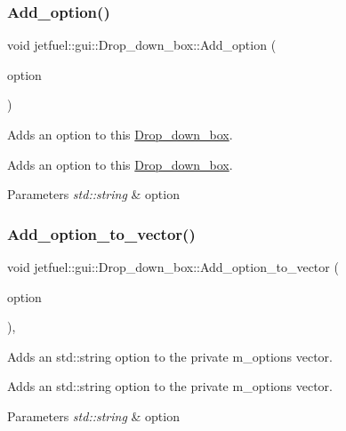 \subsubsection{\texorpdfstring{Add\+\_\+option()}{Add\_option()}}
{\footnotesize\ttfamily void jetfuel\+::gui\+::\+Drop\+\_\+down\+\_\+box\+::\+Add\+\_\+option (\begin{DoxyParamCaption}\item[{const std\+::string}]{option }\end{DoxyParamCaption})}



Adds an option to this \hyperlink{classjetfuel_1_1gui_1_1Drop__down__box}{Drop\+\_\+down\+\_\+box}. 

Adds an option to this \hyperlink{classjetfuel_1_1gui_1_1Drop__down__box}{Drop\+\_\+down\+\_\+box}.


\begin{DoxyParams}{Parameters}
{\em std\+::string} & option \\
\hline
\end{DoxyParams}
\mbox{\label{classjetfuel_1_1gui_1_1Drop__down__box_a5ed3ca41e8d6147e3af3afc94c8b8f1a}} 
\subsubsection{\texorpdfstring{Add\+\_\+option\+\_\+to\+\_\+vector()}{Add\_option\_to\_vector()}}
{\footnotesize\ttfamily void jetfuel\+::gui\+::\+Drop\+\_\+down\+\_\+box\+::\+Add\+\_\+option\+\_\+to\+\_\+vector (\begin{DoxyParamCaption}\item[{const std\+::string}]{option }\end{DoxyParamCaption})\hspace{0.3cm}{\ttfamily [inline]}, {\ttfamily [protected]}}



Adds an std\+::string option to the private m\+\_\+options vector. 

Adds an std\+::string option to the private m\+\_\+options vector.


\begin{DoxyParams}{Parameters}
{\em std\+::string} & option \\
\hline
\end{DoxyParams}
\mbox{\label{classjetfuel_1_1gui_1_1Drop__down__box_a9160249744bdd278e20a77f470421d3e}} 
